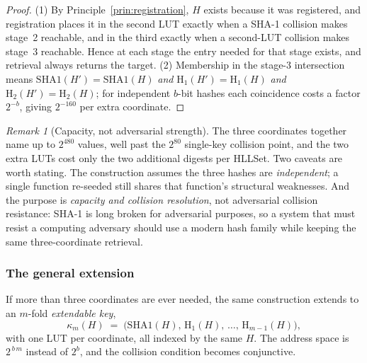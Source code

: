 \documentclass[11pt,a4paper]{article}
\theoremstyle{remark}
\newtheorem{remark}[theorem]{Remark}
\begin{document}
\begin{proof}
(1) By Principle~\ref{prin:registration}, $H$ exists because it was registered,
and registration places it in the second LUT exactly when a SHA-1 collision
makes stage~2 reachable, and in the third exactly when a second-LUT collision
makes stage~3 reachable. Hence at each stage the entry needed for that stage
exists, and retrieval always returns the target. (2) Membership in the
stage-3 intersection means
$\mathrm{SHA1}(H')=\mathrm{SHA1}(H)$ \emph{and}
$\mathrm{H}_1(H')=\mathrm{H}_1(H)$ \emph{and} $\mathrm{H}_2(H')=\mathrm{H}_2(H)$;
for independent $b$-bit hashes each coincidence costs a factor $2^{-b}$, giving
$2^{-160}$ per extra coordinate.
\end{proof}

\begin{remark}[Capacity, not adversarial strength]
The three coordinates together name up to $2^{480}$ values, well past the
$2^{80}$ single-key collision point, and the two extra LUTs cost only the two
additional digests per HLLSet. Two caveats are worth stating. The construction
assumes the three hashes are \emph{independent}; a single function re-seeded
still shares that function's structural weaknesses. And the purpose is
\emph{capacity and collision resolution}, not adversarial collision resistance:
SHA-1 is long broken for adversarial purposes, so a system that must resist a
computing adversary should use a modern hash family while keeping the same
three-coordinate retrieval.
\end{remark}

\subsubsection{The general extension}

If more than three coordinates are ever needed, the same construction extends
to an $m$-fold \emph{extendable key},
\begin{equation}
  \label{eq:multikey}
  \kappa_m(H) \;=\; \bigl(\mathrm{SHA1}(H),\, \mathrm{H}_1(H),\, \dots,\,
  \mathrm{H}_{m-1}(H)\bigr),
\end{equation}
with one LUT per coordinate, all indexed by the same $H$. The address
space is $2^{\,b\,m}$ instead of $2^b$, and the collision condition becomes
conjunctive.
\end{document}
